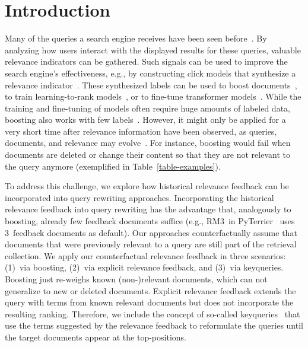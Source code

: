 \section{Introduction}

Many of the queries a search engine receives have been seen before~\cite{DBLP:journals/sigir/SilversteinHMM99}. By analyzing how users interact with the displayed results for these queries, valuable relevance indicators can be gathered. Such signals can be used to improve the search engine's effectiveness, e.g., by constructing click models that synthesize a relevance indicator~\cite{chuklin:2015}. These synthesized labels can be used to boost documents~\cite{keller:2024b}, to train learning-to-rank models~\cite{liu:2011}, or to fine-tune transformer models~\cite{lin:2021}. While the training and fine-tuning of models often require huge amounts of labeled data, boosting also works with few labels~\cite{keller:2024b}. However, it might only be applied for a very short time after relevance information have been observed, as queries, documents, and relevance may evolve~\cite{keller:2024}. For instance, boosting would fail when documents are deleted or change their content so that they are not relevant to the query anymore (exemplified in Table~\ref{table-examples}).




To address this challenge, we explore how historical relevance feedback can be incorporated into query rewriting approaches. Incorporating the historical relevance feedback into query rewriting has the advantage that, analogously to boosting, already few feedback documents suffice (e.g., RM3~in PyTerrier~\cite{macdonald:2020} uses 3~feedback documents as default). 
Our approaches counterfactually assume that documents that were previously relevant to a query are still part of the retrieval collection.
We apply our counterfactual relevance feedback in three scenarios: (1)~via boosting, (2)~via explicit relevance feedback, and (3)~via keyqueries. Boosting just 
re-weighs known (non-)relevant documents, which can not generalize to new or deleted documents. Explicit relevance feedback extends the query with terms from known relevant documents but does not incorporate the resulting ranking. Therefore, we include the concept of so-called keyqueries~\cite{gollub:2013a} that use the terms suggested by the relevance feedback to reformulate the queries until the target documents appear at the top-positions.

